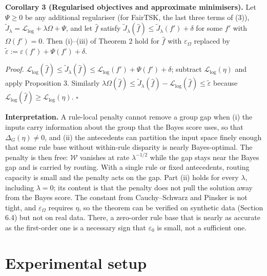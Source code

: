\textbf{Corollary 3 (Regularised objectives and approximate minimisers).} Let \(\Psi \geq 0\) be any additional regulariser (for FairTSK, the last three terms of (3)), \(\tilde J_\lambda = \mathcal{L}_{\log} + \lambda\Omega + \Psi\), and let \(\hat f\) satisfy \(\tilde J_\lambda(\hat f) \leq \tilde J_\lambda(f') + \delta\) for some \(f'\) with \(\Omega(f') = 0\). Then (i)--(iii) of Theorem 2 hold for \(\hat f\) with \(\varepsilon_\Omega\) replaced by \(\tilde\varepsilon := \varepsilon(f') + \Psi(f') + \delta\).

\emph{Proof.} \(\mathcal{L}_{\log}(\hat f) \leq \tilde J_\lambda(\hat f) \leq \mathcal{L}_{\log}(f') + \Psi(f') + \delta\); subtract \(\mathcal{L}_{\log}(\eta)\) and apply Proposition 3. Similarly \(\lambda\Omega(\hat f) \leq \tilde J_\lambda(\hat f) - \mathcal{L}_{\log}(\hat f) \leq \tilde\varepsilon\) because \(\mathcal{L}_{\log}(\hat f) \geq \mathcal{L}_{\log}(\eta)\). \(\square\)

\textbf{Interpretation.} A rule-local penalty cannot remove a group gap when (i) the inputs carry information about the group that the Bayes score uses, so that \(\Delta_{G}(\eta) \neq 0\), and (ii) the antecedents can partition the input space finely enough that some rule base without within-rule disparity is nearly Bayes-optimal. The penalty is then free: \(\mathcal W\) vanishes at rate \(\lambda^{-1/2}\) while the gap stays near the Bayes gap and is carried by routing. With a single rule or fixed antecedents, routing capacity is small and the penalty acts on the gap. Part (ii) holds for every \(\lambda\), including \(\lambda = 0\); its content is that the penalty does not pull the solution away from the Bayes score. The constant from Cauchy--Schwarz and Pinsker is not tight, and \(\varepsilon_\Omega\) requires \(\eta\), so the theorem can be verified on synthetic data (Section 6.4) but not on real data. There, a zero-order rule base that is nearly as accurate as the first-order one is a necessary sign that \(\varepsilon_0\) is small, not a sufficient one.

\hypertarget{experimental-setup}{%
\section{Experimental setup}\label{experimental-setup}}

